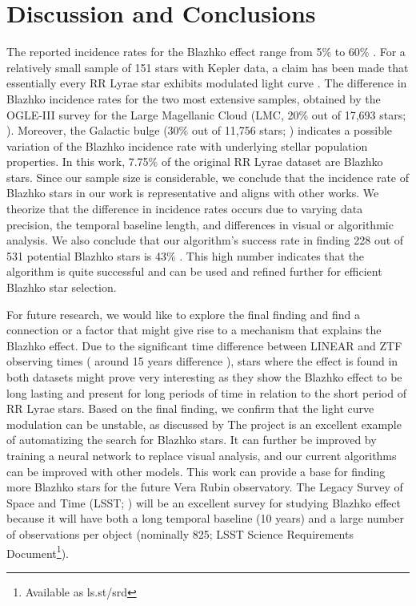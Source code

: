 
\section{Discussion and Conclusions\label{sec:discussion}}

The reported incidence rates for the Blazhko effect
range from 5\% \citep{2007MNRAS.377.1263S} to 60\% \citep{2014A&A...570A.100S}. For a relatively small sample of
151 stars with Kepler data, a claim has been made that essentially every RR Lyrae star exhibits modulated light curve
\citep{2018A&A...614L...4K}. The difference in Blazhko incidence rates for the two most extensive samples, obtained
by the OGLE-III survey for the Large Magellanic Cloud (LMC, 20\% out of 17,693 stars; \citealt{2009AcA....59....1S}).
Moreover, the Galactic bulge (30\% out of 11,756 stars; \citealt{2011AcA....61....1S}) indicates a possible variation of
the Blazhko incidence rate with underlying stellar population properties. In this work, 7.75\% of the original RR Lyrae dataset are Blazhko stars. Since our sample size is considerable, we conclude that the incidence rate of Blazhko stars in our work is representative and aligns with other works. We theorize that the difference in incidence rates occurs due to varying data precision, the temporal baseline length, and differences in visual or algorithmic analysis.
We also conclude that our algorithm's success rate in finding 228 out of 531 potential Blazhko stars is 43\% . This high number indicates that the algorithm is quite successful and can be used and refined further for efficient Blazhko star selection. 

For future research, we would like to explore the final finding and find a connection or a factor that might give rise to a mechanism that explains the Blazhko effect. Due to the significant time difference between LINEAR and ZTF observing times ( around 15 years difference ), stars
where the effect is found in both datasets might prove very interesting as they show the Blazhko effect to be long lasting and present for long periods of time in relation to the short period of RR Lyrae stars. 
Based on the final finding, we confirm that the light curve modulation can be unstable, as discussed by \cite{2009MNRAS.400.1006J} 
The project is an excellent example of automatizing the search for Blazhko stars. It can further be improved by training a neural network to replace visual analysis, and our current algorithms can be improved with other models. This work can provide a base for finding more Blazhko stars for the future Vera Rubin observatory. The Legacy Survey of Space and Time (LSST; \citealt{2019ApJ...873..111I}) will be an excellent survey for studying Blazhko effect
\citep{2022ApJS..258....4H} because it will have both a long temporal
baseline (10 years) and a large number of observations per object
(nominally 825; LSST Science Requirements Document\footnote{Available as ls.st/srd}).

